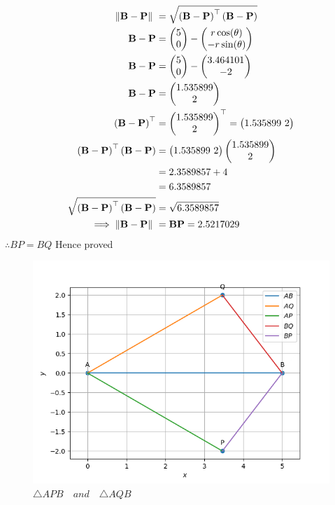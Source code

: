 \documentclass[11pt]{book}
\begin{document}
\begin{enumerate}
\begin{enumerate}
\begin{align}
\norm{\vec{B}-\vec{P}}\ &=  \sqrt{\brak{\vec{B}-\vec{P}}^{\top}\brak{\vec{B}-\vec{P}}} \\
\vec{B}-\vec{P} &= \myvec{5 \\ 0} - \myvec{r\cos(\theta) \\ -r\sin(\theta)} \\
\vec{B}-\vec{P} &= \myvec{5 \\ 0} - \myvec{3.464101 \\ -2} \\
\vec{B}-\vec{P} &= \myvec{1.535899 \\ 2} \\
\brak{\vec{B}-\vec{P}}^{\top} &= {\myvec{1.535899 \\ 2}}^{\top} = \myvec{1.535899 \ 2} \\
\brak{\vec{B}-\vec{P}}^{\top}\brak{\vec{B}-\vec{P}} &= \myvec{1.535899 \ 2} \myvec{1.535899 \\ 2}\\
&= 2.3589857 + 4 \\
&= 6.3589857 \\  
\sqrt{\brak{\vec{B}-\vec{P}}^{\top}\brak{\vec{B}-\vec{P}}} &= \sqrt{6.3589857}	\\
	\implies \norm{\vec{B}-\vec{P}}\ &= \vec{BP} = 2.5217029 
\end{align}
$\therefore  BP = BQ $ \hspace{12pt} Hence proved

\begin{figure}[H]
    \centering
    \includegraphics[width=\columnwidth]{figs/fig_mat_comp.png}
    \caption{$\triangle APB \hspace{12pt} and \hspace{12pt} \triangle AQB$}
\end{figure}
\end{enumerate}
\end{enumerate}
%
\end{document}
